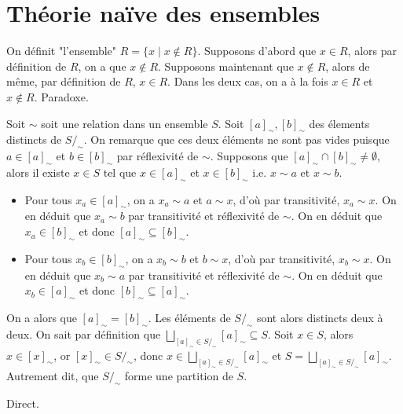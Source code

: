 \section{Théorie naïve des ensembles}

\begin{exercice}
    On définit "l'ensemble" $R = \{x \mid x \notin R\}$.
    Supposons d'abord que $x \in R$, alors par définition de $R$, on a que $x \notin R$. Supposons maintenant 
    que $x \notin R$, alors de même, par définition de $R$, $x \in R$. Dans les deux cas, on a à la fois $x \in R$ et $x \notin R$. Paradoxe.
\end{exercice}

\begin{exercice}
    Soit $\sim$ soit une relation dans un ensemble $S$.
    Soit $[a]_\sim, [b]_\sim$ des élements distincts de $S /_\sim$. On remarque que ces deux éléments ne sont pas vides puisque $a \in [a]_{\sim}$
    et $b \in [b]_\sim$ par réflexivité de $\sim$. Supposons que $[a]_\sim \cap [b]_\sim \neq \emptyset$, alors il existe $x \in S$ tel que $x \in [a]_\sim$ et $x \in [b]_\sim$ i.e. $x \sim a$ et $x \sim b$.

    \begin{itemize}
        \item Pour tous $x_a \in [a]_\sim$, on a $x_a \sim a$ et $a \sim x$, d'où par transitivité, $x_a \sim x$. On en déduit que $x_a \sim b$ par transitivité et réflexivité de $\sim$. On en déduit que $x_a \in [b]_\sim$ et donc $[a]_\sim \subseteq [b]_\sim$.
        \item Pour tous $x_b \in [b]_\sim$, on a $x_b \sim b$ et $b \sim x$, d'où par transitivité, $x_b \sim x$. On en déduit que $x_b \sim a$ par transitivité et réflexivité de $\sim$. On en déduit que $x_b \in [a]_\sim$ et donc $[b]_\sim \subseteq [a]_\sim$.
    \end{itemize}
    On a alors que $[a]_\sim = [b]_\sim$. Les éléments de $S /_\sim$ sont alors distincts deux à deux. On sait par définition que $\bigsqcup_{[a]_\sim \in S /_\sim} [a]_\sim \subseteq S$.
    Soit $x \in S$, alors $x \in [x]_\sim$, or $[x]_\sim \in S /_\sim$, donc $x \in \bigsqcup_{[a]_\sim \in S /_\sim} [a]_\sim$ et $S = \bigsqcup_{[a]_\sim \in S /_\sim} [a]_\sim$. Autrement dit, que $S/_\sim$ forme une partition de $S$.
\end{exercice}

\begin{exercice}
    Direct.
\end{exercice}

